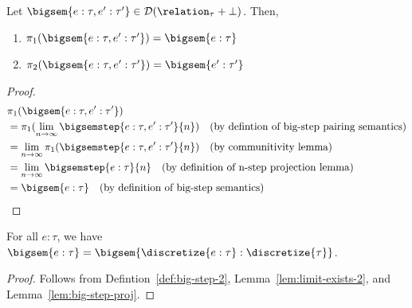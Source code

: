 \begin{lemma}\label{lem:big-step-proj}
	Let $\bigsem{e : \tau, e' : \tau'} \in \mathcal{D}(\relation_{\tau} + \bot)$. Then,
	\begin{enumerate}
		\item $\pi_1(\bigsem{e : \tau, e' : \tau'}) = \bigsem{e : \tau}$
		\item $\pi_2(\bigsem{e : \tau, e' : \tau'}) = \bigsem{e' : \tau'}$
	\end{enumerate}
\end{lemma}

\begin{proof}
	\begin{align*}
		&\pi_1(\bigsem{e : \tau, e' : \tau'}) \\
		&= \pi_1(\lim_{n \to \infty} \bigsemstep{e : \tau, e' : \tau'}{n}) \quad \text{(by defintion of big-step pairing semantics)} \\
		&= \lim_{n \to \infty} \pi_1(\bigsemstep{e : \tau, e' : \tau'}{n}) \quad \text{(by communitivity lemma)} \\
		&= \lim_{n \to \infty} \bigsemstep{e : \tau}{n} \quad \text{(by definition of n-step projection lemma)} \\
		&= \bigsem{e : \tau} \quad \text{(by definition of big-step semantics)}
	\end{align*}
\end{proof}

\begin{theorem}
	For all $e : \tau$, we have $\bigsem{e : \tau} = \bigsem{\discretize{e : \tau} : \discretize{\tau}}$.
\end{theorem}

\begin{proof}
	Follows from Defintion~\ref{def:big-step-2}, Lemma~\ref{lem:limit-exists-2}, and Lemma~\ref{lem:big-step-proj}.
\end{proof}